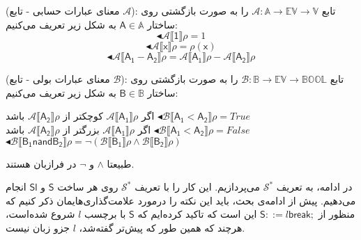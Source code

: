 \begin{defn}
	(معنای عبارات حسابی - تابع $\mathcal{A}$): تابع 
	$\mathcal{A}:\mathbb{A}\rightarrow \mathbb{EV} \rightarrow \mathbb{V}$
	را به صورت بازگشتی روی ساختار 
	$\mathsf{A} \in \mathbb{A}$
	به شکل زیر تعریف می‌کنیم:
	$$\blacktriangleleft\mathcal{A\llbracket\mathsf{1}\rrbracket\rho = }1     $$
	$$\blacktriangleleft\mathcal{A\llbracket\mathsf{x}\rrbracket\rho = } \rho(\mathsf{x})          $$
	$$\blacktriangleleft\mathcal{A\llbracket\mathsf{A_1-A_2}\rrbracket\rho = }\mathcal{A\llbracket\mathsf{A_1}\rrbracket\rho }- \mathcal{A\llbracket\mathsf{A_2}\rrbracket\rho }       $$
	
\end{defn}

\begin{defn}
	(معنای عبارات بولی - تابع $\mathcal{B}$): تابع 
	$\mathcal{B}: \mathbb{B} \rightarrow \mathbb{EV} \rightarrow \mathbb{BOOL}$
	را به صورت بازگشتی روی ساختار 
	$\mathsf{B} \in \mathbb{B}$
	به شکل زیر تعریف می‌کنیم:
	
	\begin{center}
		اگر $\mathcal{A\llbracket\mathsf{A_1}\rrbracket\rho }$ کوچکتر از $\mathcal{A\llbracket\mathsf{A_2}\rrbracket\rho }$ باشد
		$\blacktriangleleft\mathcal{B\llbracket\mathsf{A_1<A_2}\rrbracket\rho = } True   \hspace{2cm}  $\\
		اگر $\mathcal{A\llbracket\mathsf{A_1}\rrbracket\rho }$ بزرگتر از $\mathcal{A\llbracket\mathsf{A_2}\rrbracket\rho }$ باشد
		$\blacktriangleleft\mathcal{B\llbracket\mathsf{A_1<A_2}\rrbracket\rho = } False   \hspace{2cm}  $\\
		$ \blacktriangleleft\mathcal{B\llbracket\mathsf{B_1 nand B_2}\rrbracket\rho = } \neg(\mathcal{B\llbracket\mathsf{B_1}\rrbracket\rho}   \wedge \mathcal{B\llbracket\mathsf{B_2}\rrbracket\rho}) $
	\end{center}

طبیعتا $\wedge$ و $\neg$ در فرازبان هستند.
\end{defn}

در ادامه، به تعریف $\mathcal{S^*}$ می‌پردازیم. این کار را با تعریف $\mathcal{S^*}$ روی هر ساخت $\mathsf{S}$ و $\mathsf{Sl}$ انجام می‌دهیم.
پیش از ادامه‌ی بحث، باید این نکته را در‌مورد علامت‌گذاری‌هایمان ذکر کنیم که منظور از $        \mathsf{S} ::= l \mathsf{break;}  $ این است که تاکید کرده‌ایم که $\mathsf{S}$ با برچسب $l$ شروع شده‌است، هرچند که همین طور که پیش‌تر گفته‌شد،   $l$ جزو زبان نیست.

